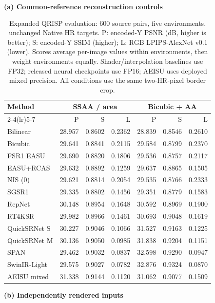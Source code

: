\documentclass[10pt,twocolumn,letterpaper]{article}
\newcommand{\model}{AEISU}
\begin{document}
\begin{table}[t]
\centering
\caption{Expanded QRISP evaluation: 600 source pairs, five environments, unchanged Native HR targets. P: encoded-Y PSNR (dB, higher is better); S: encoded-Y SSIM (higher); L: RGB LPIPS-AlexNet v0.1 (lower). Scores average per-image values within environments, then weight environments equally. Shader/interpolation baselines use FP32; released neural checkpoints use FP16; \model{} uses deployed mixed precision. All conditions use the same two-HR-pixel border crop.}
\label{tab:final-qrisp}
\begingroup\fontsize{8}{9.5}\selectfont\setlength{\tabcolsep}{3.2pt}
\renewcommand{\arraystretch}{1.0}
\textbf{(a) Common-reference reconstruction controls}\par\smallskip
\begin{tabular}{l*{6}{r}}
\toprule
Method & \multicolumn{3}{c}{SSAA / area} & \multicolumn{3}{c}{Bicubic + AA}\\
\cmidrule(lr){2-4}\cmidrule(lr){5-7}
 & P & S & L & P & S & L\\
\midrule
Bilinear & 28.957 & 0.8602 & 0.2362 & 28.839 & 0.8546 & 0.2610 \\
Bicubic & 29.641 & 0.8841 & 0.2115 & 29.584 & 0.8799 & 0.2370 \\
FSR1 EASU & 29.690 & 0.8820 & 0.1806 & 29.536 & 0.8757 & 0.2117 \\
EASU+RCAS & 29.632 & 0.8892 & 0.1259 & 29.637 & 0.8865 & 0.1505 \\
NIS (0) & 29.621 & 0.8814 & 0.2054 & 29.535 & 0.8766 & 0.2333 \\
SGSR1 & 29.335 & 0.8802 & 0.1456 & 29.351 & 0.8779 & 0.1583 \\
RepNet & 30.148 & 0.8954 & 0.1648 & 30.592 & 0.8969 & 0.1900 \\
RT4KSR & 29.982 & 0.8966 & 0.1461 & 30.693 & 0.9048 & 0.1619 \\
QuickSRNet S & 30.227 & 0.9046 & 0.1066 & 31.527 & 0.9163 & 0.1225 \\
QuickSRNet M & 30.136 & 0.9050 & 0.0985 & 31.838 & 0.9204 & 0.1151 \\
SPAN & 29.462 & 0.9032 & 0.0837 & 32.598 & 0.9290 & 0.0947 \\
SwinIR-Light & 29.575 & 0.9027 & 0.0782 & 32.876 & 0.9324 & 0.0870 \\
\midrule
\model{} mixed & 31.338 & 0.9144 & 0.1120 & 31.062 & 0.9077 & 0.1509 \\
\bottomrule
\end{tabular}
\par\medskip
\textbf{(b) Independently rendered inputs}\par\smallskip

\end{table}
\end{document}
